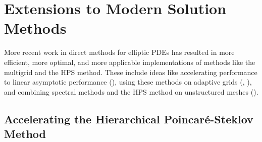 \section{Extensions to Modern Solution Methods}
\label{sec:extensions}

More recent work in direct methods for elliptic PDEs has resulted in more efficient, more optimal, and more applicable implementations of methods like the multigrid and the HPS method. These include ideas like accelerating performance to linear asymptotic performance (\cite{gillman2014direct}), using these methods on adaptive grids (\cite{geldermans2019adaptive}, \cite{popinet2015quadtree}), and combining spectral methods and the HPS method on unstructured meshes (\cite{fortunato2020ultraspherical}).

\subsection{Accelerating the Hierarchical Poincaré-Steklov Method}

